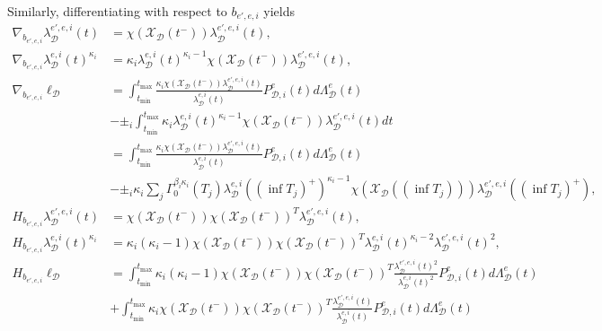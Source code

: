 \documentclass[honours,12pt]{unswthesis}
\numberwithin{equation}{section}
\begin{document}
Similarly, differentiating with respect to $b_{e',e,i}$ yields
\begin{equation*}
	\begin{align}
		\nabla_{b_{e',e,i}} \lambda_\mathcal{D}^{e',e,i}(t) &= \chi(\mathcal{X}_\mathcal{D}(t^-)) \lambda_\mathcal{D}^{e',e,i}(t), \\
		\nabla_{b_{e',e,i}} \lambda_\mathcal{D}^{e,i}(t)^{\kappa_i} &= \kappa_i \lambda_\mathcal{D}^{e,i}(t)^{\kappa_i-1} \chi(\mathcal{X}_\mathcal{D}(t^-)) \lambda_\mathcal{D}^{e',e,i}(t), \\
		\nabla_{b_{e',e,i}} \ell_\mathcal{D} &= \int_{t_\mathrm{min}}^{t_\mathrm{max}} \frac{\kappa_i \chi(\mathcal{X}_\mathcal{D}(t^-))\lambda_\mathcal{D}^{e',e,i}(t) }{\lambda_\mathcal{D}^{e,i}(t)} P_{\mathcal{D},i}^e(t) d\Lambda_\mathcal{D}^e(t) \\
		&- \pm_i \int_{t_\mathrm{min}}^{t_\mathrm{max}} \kappa_i \lambda_\mathcal{D}^{e,i}(t)^{\kappa_i-1} \chi(\mathcal{X}_\mathcal{D}(t^-)) \lambda_\mathcal{D}^{e',e,i}(t) dt \\
		&= \int_{t_\mathrm{min}}^{t_\mathrm{max}} \frac{\kappa_i \chi(\mathcal{X}_\mathcal{D}(t^-)) \lambda_\mathcal{D}^{e',e,i}(t) }{\lambda_\mathcal{D}^{e,i}(t)} P_{\mathcal{D},i}^e(t) d\Lambda_\mathcal{D}^e(t) \\
		&- \pm_i \kappa_i \sum_j \Gamma_0^{\beta_i\kappa_i}(T_j)\lambda_\mathcal{D}^{e,i}((\inf T_j)^+)^{\kappa_i-1} \chi(\mathcal{X}_\mathcal{D}((\inf T_j))) \lambda_\mathcal{D}^{e',e,i}((\inf T_j)^+), \\
		H_{b_{e',e,i}} \lambda_\mathcal{D}^{e',e,i}(t) &= \chi(\mathcal{X}_\mathcal{D}(t^-)) \chi(\mathcal{X}_\mathcal{D}(t^-))^T \lambda_\mathcal{D}^{e',e,i}(t), \\
		H_{b_{e',e,i}} \lambda_\mathcal{D}^{e,i}(t)^{\kappa_i} &= \kappa_i(\kappa_i-1) \chi(\mathcal{X}_\mathcal{D}(t^-)) \chi(\mathcal{X}_\mathcal{D}(t^-))^T \lambda_\mathcal{D}^{e,i}(t)^{\kappa_i-2} \lambda_\mathcal{D}^{e',e,i}(t)^2, \\
		H_{b_{e',e,i}} \ell_\mathcal{D} &= \int_{t_\mathrm{min}}^{t_\mathrm{max}} \kappa_i(\kappa_i-1) \chi(\mathcal{X}_\mathcal{D}(t^-)) \chi(\mathcal{X}_\mathcal{D}(t^-))^T \frac{\lambda_\mathcal{D}^{e',e,i}(t)^2 }{\lambda_\mathcal{D}^{e,i}(t)^2} P_{\mathcal{D},i}^e(t) d\Lambda_\mathcal{D}^e(t) \\
		&+ \int_{t_\mathrm{min}}^{t_\mathrm{max}} \kappa_i \chi(\mathcal{X}_\mathcal{D}(t^-)) \chi(\mathcal{X}_\mathcal{D}(t^-))^T \frac{\lambda_\mathcal{D}^{e',e,i}(t)}{\lambda_\mathcal{D}^{e,i}(t)} P_{\mathcal{D},i}^e(t) d\Lambda_\mathcal{D}^e(t) \\

\end{align}
\end{equation*}
\end{document}

